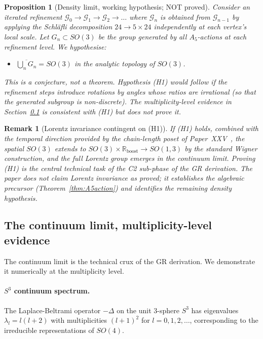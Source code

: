 \documentclass[12pt]{article}
\newtheorem{proposition}[theorem]{Proposition}
\newtheorem{remark}[theorem]{Remark}
\newcommand{\Gcal}{\mathcal{G}}
\begin{document}
\begin{proposition}[Density limit, working hypothesis; NOT proved]\label{prop:density}
Consider an iterated refinement $\Gcal_0 \to \Gcal_1 \to \Gcal_2 \to \ldots$ where $\Gcal_n$ is obtained from $\Gcal_{n-1}$ by applying the Schl\"afli decomposition $24 \to 5 \times 24$ independently at each vertex's local scale. Let $G_n \subset SO(3)$ be the group generated by all $A_5$-actions at each refinement level. We hypothesise:
\begin{itemize}
    \item[(H1)] $\overline{\bigcup_n G_n} = SO(3)$ in the analytic topology of $SO(3)$.
\end{itemize}
\emph{This is a conjecture, not a theorem.} Hypothesis (H1) would follow if the refinement steps introduce rotations by angles whose ratios are irrational (so that the generated subgroup is non-discrete). The multiplicity-level evidence in Section~\ref{sec:gr:continuum} is consistent with (H1) but does not prove it.
\end{proposition}

\begin{remark}[Lorentz invariance contingent on (H1)]
If (H1) holds, combined with the temporal direction provided by the chain-length poset of Paper~XXV~\citep{SmartXXV}, the spatial $SO(3)$ extends to $SO(3) \times \mathbb{R}_{\mathrm{boost}} \to SO(1,3)$ by the standard Wigner construction, and the full Lorentz group emerges in the continuum limit. Proving (H1) is the central technical task of the C2 sub-phase of the GR derivation. The paper does not claim Lorentz invariance as proved; it establishes the algebraic precursor (Theorem~\ref{thm:A5action}) and identifies the remaining density hypothesis.
\end{remark}

\subsection{The continuum limit, multiplicity-level evidence}\label{sec:gr:continuum}

The continuum limit is the technical crux of the GR derivation. We demonstrate it numerically at the multiplicity level.

\paragraph{$S^3$ continuum spectrum.} The Laplace-Beltrami operator $-\Delta$ on the unit 3-sphere $S^3$ has eigenvalues $\lambda_l = l(l+2)$ with multiplicities $(l+1)^2$ for $l = 0, 1, 2, \ldots$, corresponding to the irreducible representations of $SO(4)$.
\end{document}
